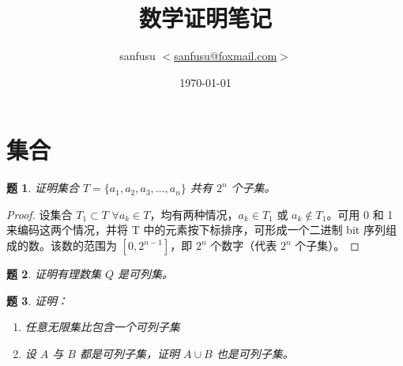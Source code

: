\documentclass{ctexart}
\title{数学证明笔记}
\author{sanfusu $<$\href{mailto:sanfusu@foxmail.com}{sanfusu@foxmail.com}$>$}
\date{\today}
\newtheorem{Question}{题}[section]
\begin{document}
\maketitle

\section{集合}
\begin{Question}
证明集合 $T=\{a_1, a_2, a_3, \ldots, a_n\}$ 共有 $2^n$ 个子集。
\end{Question}
\begin{proof}
设集合 $T_1 \subset T$
$\forall a_k \in T$，均有两种情况，$a_k \in T_1$ 或 $a_k \notin T_1$。可用 0 和 1 来编码这两个情况，并将 T 中的元素按下标排序，可形成一个二进制 bit 序列组成的数。该数的范围为 $[0, 2^{n-1}]$，即 $2^n$ 个数字（代表 $2^n$ 个子集）。
\end{proof}

\begin{Question}
证明有理数集 $Q$ 是可列集。
\end{Question}
\begin{Question}
证明：
\begin{enumerate}
\item 任意无限集比包含一个可列子集
\item 设 $A$ 与 $B$ 都是可列子集，证明 $A \cup B$ 也是可列子集。
\end{enumerate}
\end{Question}
%
\end{document}
